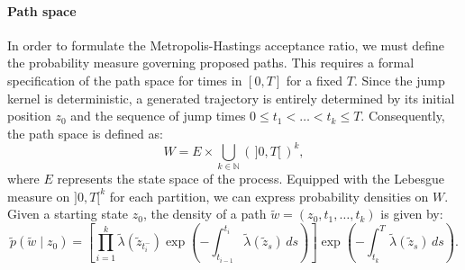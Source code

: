 \documentclass{article}
\begin{document}
\paragraph{Path space}
In order to formulate the Metropolis-Hastings acceptance ratio, we must define the probability measure governing proposed paths. This requires a formal specification of the path space for times in $[0,T]$ for a fixed $T$. Since the jump kernel is deterministic, a generated trajectory is entirely determined by its initial position $z_0$ and the sequence of jump times $0 \leq t_1 < \dots < t_k \leq T$. Consequently, the path space is defined as:
\[
    W = E \times \bigcup_{k \in \mathbb{N}} \left(\, ]0,T[ \,\right)^k,
\]
where $E$ represents the state space of the process. Equipped with the Lebesgue measure on $]0,T[^k$ for each partition, we can express probability densities on $W$. Given a starting state $z_0$, the density of a path $\tilde{w} = (z_0, t_1, \dots, t_k)$ is given by:
\begin{equation}
    \label{eq:proba-path}
    \tilde{p}(\tilde{w} \mid z_0)
    = \left[ \prod_{i=1}^k 
        \tilde{\lambda}(\tilde{z}_{t_i^-}) 
        \exp\!\left( -\int_{t_{i-1}}^{t_i} \tilde{\lambda}(\tilde{z}_s)\,ds \right)  \right]
        \exp\!\left( -\int_{t_k}^{T} \tilde{\lambda}(\tilde{z}_s)\,ds \right).
\end{equation}
\end{document}
